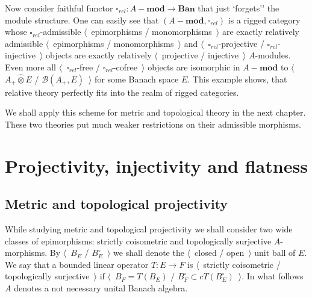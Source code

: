 \documentclass[12pt]{article}
\newcommand{\projtens}{\mathbin{\widehat{\otimes}}}
\begin{document}
Now consider faithful functor $\square_{rel}:A-\mathbf{mod}\to\mathbf{Ban}$ that just
`forgets'' the module structure. One can easily see that
$(A-\mathbf{mod},\square_{rel})$ is a rigged category whose $\square_{rel}$-admissible
$\langle$~epimorphisms / monomorphisms~$\rangle$ are exactly relatively
admissible $\langle$~epimorphisms / monomorphisms~$\rangle$ and
$\langle$~$\square_{rel}$-projective / $\square_{rel}$-injective~$\rangle$
objects are exactly relatively $\langle$~projective / injective~$\rangle$
$A$-modules. Even more all $\langle$~$\square_{rel}$-free /
$\square_{rel}$-cofree~$\rangle$ objects are isomorphic in $A-\mathbf{mod}$ to
$\langle$~$A_+\projtens E$ / $\mathcal{B}(A_+,E)$~$\rangle$ for some Banach
space $E$. This example shows, that relative theory perfectly fits into the
realm of rigged categories.

We shall apply this scheme for metric and topological theory in the next
chapter. These two theories put much weaker restrictions on their admissible
morphisms.


\section{Projectivity, injectivity and
  flatness}\label{SectionProjectivityInjectivityAndFlatness}



\subsection{Metric and topological
    projectivity}\label{SubSectionMetricAndTopologicalProjectivity}

While studying metric and topological projectivity we shall consider two wide
classes of epimorphisms: strictly coisometric and topologically surjective
$A$-morphisms. By $\langle$~$B_E$ / $B_E^\circ$~$\rangle$ we shall denote the
$\langle$~closed / open~$\rangle$ unit ball of $E$. We say that a bounded linear
operator $T:E\to F$ is $\langle$~strictly coisometric / topologically
surjective~$\rangle$ if $\langle$~$B_F=T(B_E)$ / $B_F^\circ\subset
    cT(B_E^\circ)$~$\rangle$. In what follows $A$ denotes a not necessary unital
Banach algebra.
\end{document}

